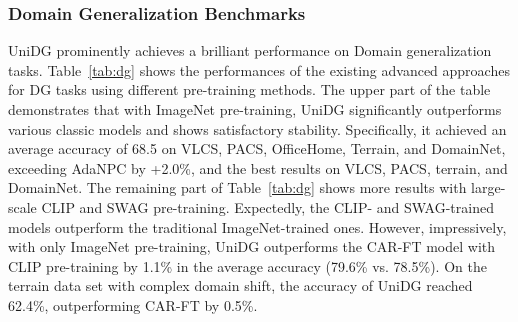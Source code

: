 \documentclass{article} \usepackage{iclr2024_conference,times}
\def\Model{UniDG }
\begin{document}
\subsubsection{Domain Generalization Benchmarks} \label{sec:exp:main_results:dg}
\Model prominently achieves a brilliant performance on Domain generalization tasks. Table~\ref{tab:dg} shows the performances of the existing advanced approaches for DG tasks using different pre-training methods. The upper part of the table demonstrates that with ImageNet pre-training, \Model significantly outperforms various classic models and shows satisfactory stability. Specifically, it achieved an average accuracy of 68.5 on VLCS, PACS, OfficeHome, Terrain, and DomainNet, exceeding AdaNPC by +2.0\%, and the best results on VLCS, PACS, terrain, and DomainNet. The remaining part of Table~\ref{tab:dg} shows more results with large-scale CLIP and SWAG pre-training. Expectedly, the CLIP- and SWAG-trained models outperform the traditional ImageNet-trained ones. However, impressively, with only ImageNet pre-training, \Model outperforms the CAR-FT model with CLIP pre-training by 1.1\% in the average accuracy (79.6\% vs. 78.5\%). On the terrain data set with complex domain shift, the accuracy of \Model reached 62.4\%, outperforming CAR-FT by 0.5\%.
\end{document}
